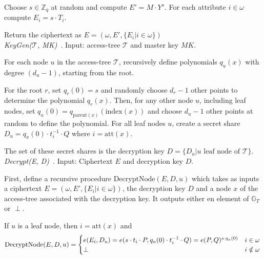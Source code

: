 Choose $s \in \mathbb{Z}_q$ at random and compute $E' = M \cdot Y^s$.
For each attribute $i \in \omega$ compute $E_i = s \cdot T_i$.

Return the ciphertext as $E = (\omega, E', \{E_i | i \in \omega\})$
\\

\noindent \emph{KeyGen($\mathcal{T}$, MK)}~\cite{goyal_attribute-based_2006}.
Input: \gls{access-tree} $\mathcal{T}$ and master key $MK$.

For each node $u$ in the \gls{access-tree} $\mathcal{T}$, recursively define polynomials $q_u(x)$ with degree $(d_u - 1)$, starting from the root.

For the root $r$, set $q_r(0) = s$ and randomly choose $d_r -1$ other points to determine the polynomial $q_r(x)$.
Then, for any other node $u$, including leaf nodes, set $q_u(0) = q_{\text{parent}(x)}(\text{index}(x))$ and choose $d_u -1$ other points at random to define the polynomial. 
For all leaf nodes $u$, create a secret share $D_u = q_x(0) \cdot t_i^{-1} \cdot Q$ where $i = \text{att}(x)$.

The set of these secret shares is the decryption key $D = \{D_u | u \text{ leaf node of } \mathcal{T}\}$.
\\

\noindent \emph{Decrypt(E, D)}~\cite{goyal_attribute-based_2006}.
Input: Ciphertext $E$ and decryption key $D$.

First, define a recursive procedure $\text{DecryptNode}(E, D, u)$ which takes as inputs a ciphertext $E = (\omega, E', \{E_i | i \in \omega\})$, the decryption key $D$ and a node $x$ of the \gls{access-tree} associated with the decryption key.
It outputs either en element of $\mathbb{G}_T$ or $\perp$.

If $u$ is a leaf node, then $i = \text{att}(x)$ and 
\begin{equation}
    \text{DecryptNode}(E, D, u) = \begin{cases}
        e(E_i, D_u) = e(s \cdot t_i \cdot P, q_u(0) \cdot t_i^{-1} \cdot Q) = e(P, Q)^{s\cdot q_u(0)} & i \in \omega\\
        \perp & i \notin \omega
    \end{cases}\\
\end{equation}

